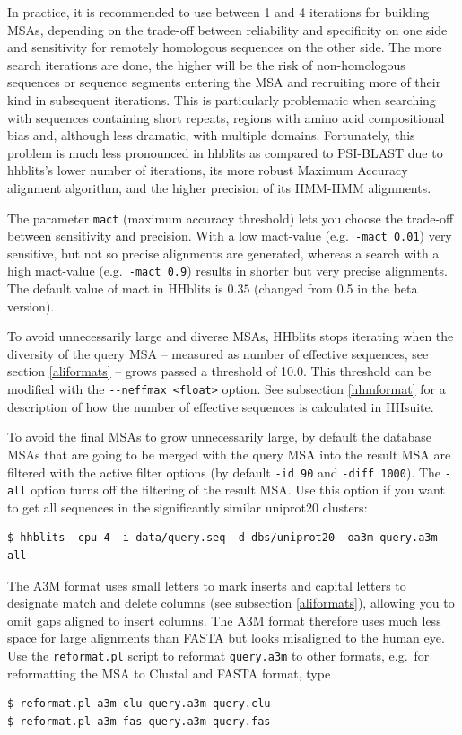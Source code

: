 \documentclass[11pt,a4paper]{article}
\begin{document}
In practice, it is recommended to use between 1 and 4 iterations for building MSAs, depending on the trade-off between reliability and specificity on one side and sensitivity for remotely homologous sequences on the other side. The more search iterations are done, the higher will be the risk of non-homologous sequences or sequence segments entering the MSA and recruiting more of their kind in subsequent iterations. This is particularly problematic when searching with sequences containing short repeats, regions with amino acid compositional bias and, although less dramatic,  with multiple domains. Fortunately, this problem is much less pronounced in hhblits as compared to PSI-BLAST due to hhblits's lower number of iterations, its more robust Maximum Accuracy alignment algorithm, and the higher precision of its HMM-HMM alignments. 

The parameter \verb`mact` (maximum accuracy threshold) lets you choose the trade-off between sensitivity and 
precision. With a low mact-value (e.g.\ \verb`-mact 0.01`) very sensitive, but not 
so precise alignments are generated, whereas a search with a high mact-value (e.g.\ \verb`-mact 0.9`) 
results in shorter but very precise alignments. The default value of mact in HHblits is $0.35$ 
(changed from 0.5 in the beta version). 

To avoid unnecessarily large and diverse MSAs, HHblits stops iterating when the diversity of the query MSA -- measured as number of effective sequences, see section \ref{aliformats} -- grows passed a threshold of 10.0. This threshold can be modified with the \verb`--neffmax <float>` option. See subsection \ref{hhmformat} for a description of how the number of effective sequences is calculated in HHsuite.

To avoid the final MSAs to grow unnecessarily large, by default the database MSAs that are going to be merged with the query MSA into the result MSA are filtered with the active filter options (by default \verb`-id 90` and \verb`-diff 1000`). The \verb`-all` option turns off the filtering of the result MSA. Use this option if you want to get all sequences in the significantly similar uniprot20 clusters: 
\begin{verbatim}
$ hhblits -cpu 4 -i data/query.seq -d dbs/uniprot20 -oa3m query.a3m -all
\end{verbatim}

The A3M format uses small letters to mark inserts and capital letters to designate match and delete columns (see subsection \ref{aliformats}), allowing you to omit gaps aligned to insert columns. The A3M format therefore uses much less space for large alignments than FASTA but looks misaligned to the human eye. Use the \verb`reformat.pl` script to reformat \verb`query.a3m` to other formats, e.g.\ for reformatting the MSA to Clustal and FASTA format, type
\begin{verbatim}
$ reformat.pl a3m clu query.a3m query.clu
$ reformat.pl a3m fas query.a3m query.fas
\end{verbatim}
\end{document}
